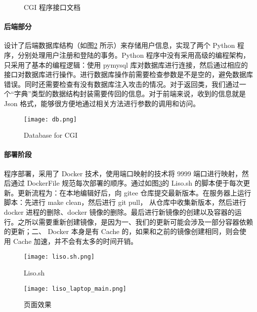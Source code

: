 \begin{figure}[htbp!]
    \centering
    \caption{CGI 程序接口文档} \label{fig:CGIPORT}
\end{figure}


\paragraph*{后端部分} 设计了后端数据库结构（如图\ref{fig:database} 所示）来存储用户信息，实现了两个 Python 程序，分别处理用户注册和登陆的事务。Python 程序中没有采用高级的编程架构，只采用了基本的编程逻辑：使用 pymysql 库对数据库进行连接，然后通过相应的接口对数据库进行操作。进行数据库操作前需要检查参数是不是空的，避免数据库错误。同时还需要检查有没有数据库注入攻击的情况。对于返回类，我们通过一个“字典”类型的数据结构封装需要传回的信息。对于前端来说，收到的信息就是 Json 格式，能够很方便地通过相关方法进行参数的调用和访问。

\begin{figure}[htbp!]
    \centering
    \texttt{[image: db.png]}
    \caption{Database for CGI}\label{fig:database}
\end{figure}

\paragraph*{部署阶段} 程序部署，采用了 Docker 技术，使用端口映射的技术将 9999 端口进行映射，然后通过 DockerFile 规范每次部署的顺序。通过如图\ref{fig:Liso.sh}的 Liso.sh 的脚本便于每次更新。更新流程为：在本地编辑好后，向 gitee 仓库提交最新版本。在服务器上运行脚本：先进行 make clean，然后进行 git pull， 从仓库中收集新版本，然后进行 docker 进程的删除、docker 镜像的删除。最后进行新镜像的创建以及容器的运行。之所以需要重新创建镜像，是因为一、我们的更新可能会涉及一部分容器依赖的更新；二、 Docker 本身是有 Cache 的，如果和之前的镜像创建相同，则会使用 Cache 加速，并不会有太多的时间开销。

\begin{figure}[htbp!]
    \begin{center}
        \texttt{[image: liso.sh.png]}
        \caption{Liso.sh}\label{fig:Liso.sh}
    \end{center}
\end{figure}



\begin{figure}[htbp!]
    \begin{center}
        \texttt{[image: liso\_laptop\_main.png]}
        \caption{页面效果}\label{fig:lap}
    \end{center}
\end{figure}

